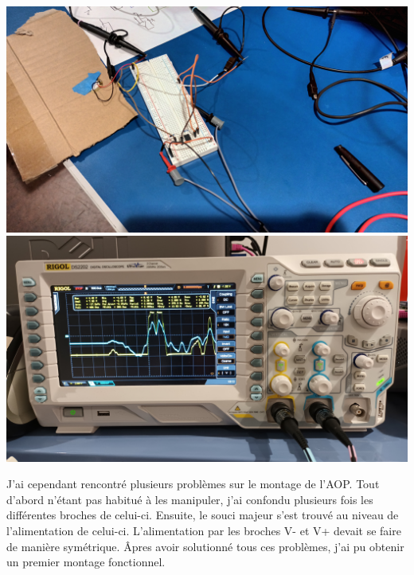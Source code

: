 \documentclass[12pt]{article}
\begin{document}
\begin{center}	
	\includegraphics[scale=0.08]{montage_piezo_aop.jpg}
	\label{image3}
	\includegraphics[scale=0.08]{sortie_osciloscope.jpg}
	\label{image4}
\end{center}
\newpage
J'ai cependant rencontré plusieurs problèmes sur le montage de l'AOP. Tout d'abord n'étant pas habitué 
à les manipuler, j'ai confondu plusieurs fois les différentes broches de celui-ci. Ensuite, le souci majeur 
s'est trouvé au niveau de l'alimentation de celui-ci. L'alimentation par les broches V- et V+ devait se faire 
de manière symétrique. 
Âpres avoir solutionné tous ces problèmes, j'ai pu obtenir un premier montage fonctionnel.
\end{document}
